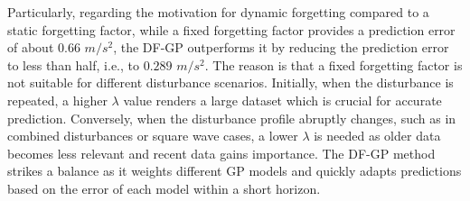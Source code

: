 Particularly, regarding the motivation for dynamic forgetting compared to a static forgetting factor, while a fixed forgetting factor provides a prediction error of about $0.66$ $m/s^2$, the \ac{DF-GP} outperforms it by reducing the prediction error to less than half, i.e., to $0.289$ $m/s^2$. The reason is that a fixed forgetting factor is not suitable for different disturbance scenarios. Initially, when the disturbance is repeated, a higher $\lambda$ value renders a large dataset which is crucial for accurate prediction. Conversely, when the disturbance profile abruptly changes, such as in combined disturbances or square wave cases, a lower $\lambda$ is needed as older data becomes less relevant and recent data gains importance. The \ac{DF-GP} method strikes a balance as it weights different \ac{GP} models and quickly adapts predictions based on the error of each model within a short horizon.



